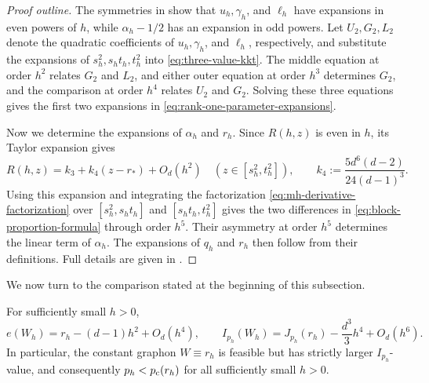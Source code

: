 \begin{proof}[Proof outline]
The symmetries in  show that
$u_h,\gamma_h$, and $\ell_h$ have expansions in even powers of $h$, while
$\alpha_h-1/2$ has an expansion in odd powers.  Let $U_2, G_2, L_2$
denote the quadratic coefficients of $u_h,\gamma_h$, and $\ell_h$,
respectively, and substitute the expansions of $s_h^2,s_ht_h,t_h^2$ into
\eqref{eq:three-value-kkt}.
The middle equation at order $h^2$ relates $G_2$ and $L_2$,
and either outer equation at order $h^3$ determines $G_2$,
and the comparison at order $h^4$ relates $U_2$ and $G_2$.
Solving these three equations gives the first two expansions in
\eqref{eq:rank-one-parameter-expansions}.

Now we determine the expansions of $\alpha_h$ and $r_h$.
Since $R(h,z)$ is even in $h$, its Taylor expansion gives
\[
  R(h,z)=k_3+k_4(z-r_*)+O_d(h^2)
  \quad (z\in[s_h^2,t_h^2]),
  \qquad
  k_4:=\frac{5d^6(d-2)}{24(d-1)^3}.
\]
Using this expansion and integrating the factorization
\eqref{eq:mh-derivative-factorization} over $[s_h^2,s_ht_h]$ and
$[s_ht_h,t_h^2]$ gives the two differences in \eqref{eq:block-proportion-formula}
through order $h^5$.  Their asymmetry at order $h^5$ determines the linear
term of $\alpha_h$.  The expansions of $q_h$ and $r_h$ then follow from
their definitions.
Full details are given in .
\end{proof}

We now turn to the comparison stated at the beginning of this subsection.

\begin{lemma}
\label{lem:constant-graphon-comparison}
For sufficiently small $h>0$,
\[
  e(W_h)=r_h-(d-1)h^2+O_d(h^4),
  \qquad
  I_{p_h}(W_h)=J_{p_h}(r_h)-\frac{d^3}{3}h^4+O_d(h^6).
\]
In particular, the constant graphon
$W\equiv r_h$ is feasible but has strictly larger $I_{p_h}$-value,
and consequently $p_h<p_{\mathrm c}(r_h)$ for all sufficiently small $h>0$.
\end{lemma}

